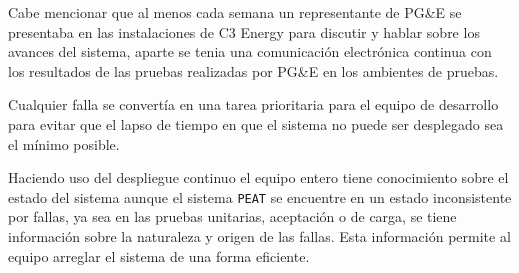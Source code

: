 Cabe mencionar que al menos cada semana un representante de PG\&E se presentaba
en las instalaciones de C3 Energy para discutir y hablar sobre los avances del
sistema, aparte se tenia una comunicación electrónica continua con los resultados
de las pruebas realizadas por PG\&E en los ambientes de pruebas.

Cualquier falla se convertía en una tarea prioritaria para el equipo de desarrollo
para evitar que el lapso de tiempo en que el sistema no puede ser desplegado sea
el mínimo posible.

Haciendo uso del despliegue continuo el equipo entero tiene conocimiento sobre el
estado del sistema aunque el sistema \texttt{PEAT} se encuentre en un estado
inconsistente por fallas, ya sea en las pruebas unitarias, aceptación o de carga,
se tiene información sobre la naturaleza y origen de las fallas. Esta información
permite al equipo arreglar el sistema de una forma eficiente.
